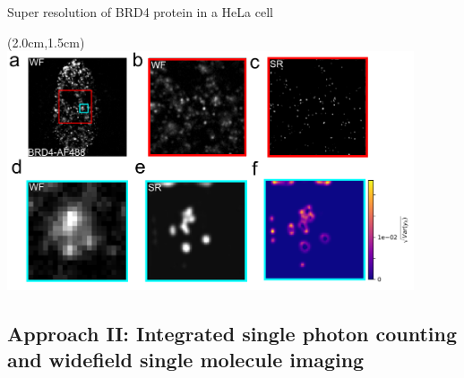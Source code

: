 \documentclass{beamer}					%
\begin{document}

\begin{frame}{Super resolution of BRD4 protein in a HeLa cell}
\begin{textblock*}{12cm}(2.0cm,1.5cm)
\includegraphics[width=12cm]{../../ddpm/ddpm/media/BRD4/Deep2.png}
\end{textblock*}


\end{frame}

\subsection{Approach II: Integrated single photon counting and widefield single molecule imaging}
\end{document}
